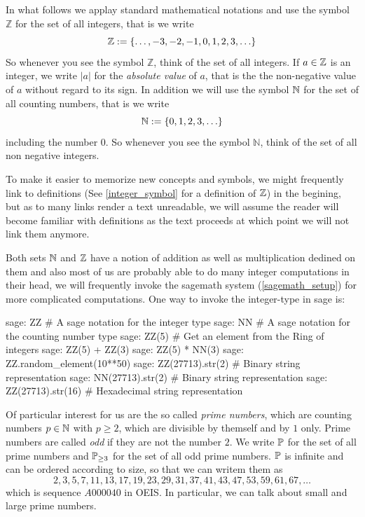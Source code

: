 In what follows we applay standard mathematical notations and use the symbol $\mathbb{Z}$ for the set of all integers, that is we write
\begin{equation}
\label{integer_symbol}
\mathbb{Z} := \{\ldots, -3,-2,-1,0,1,2,3,\ldots\}
\end{equation}
So whenever you see the symbol $\mathbb{Z}$, think of the set of all integers. If $a \in \mathbb{Z}$ is an integer, we write $|a|$ for the \textit{absolute value} of $a$, that is the the non-negative value of $a$ without regard to its sign. In addition we will use the symbol $\mathbb{N}$ for the set of all counting numbers, that is we write 
\begin{equation}
\label{integer_symbol}
\mathbb{N} := \{0,1,2,3,\ldots\}
\end{equation}
including the number $0$. So whenever you see the symbol $\mathbb{N}$, think of the set of all non negative integers. 

To make it easier to memorize new concepts and symbols, we might frequently link to definitions (See \ref{integer_symbol} for a definition of $\mathbb{Z}$) in the begining, but as to many links render a text unreadable, we will assume the reader will become familiar with definitions as the text proceeds at which point we will not link them anymore. 

Both sets $\mathbb{N}$ and $\mathbb{Z}$ have a notion of addition as well as multiplication dedined on them and also most of us are probably able to do many integer computations in their head, we will frequently invoke the sagemath system (\ref{sagemath_setup}) for more complicated computations. One way to invoke the integer-type in sage is:
\begin{sagecommandline}
sage: ZZ # A sage notation for the integer type
sage: NN # A sage notation for the counting number type
sage: ZZ(5) # Get an element from the Ring of integers
sage: ZZ(5) + ZZ(3)
sage: ZZ(5) * NN(3)
sage: ZZ.random_element(10**50)
sage: ZZ(27713).str(2) # Binary string representation
sage: NN(27713).str(2) # Binary string representation
sage: ZZ(27713).str(16) # Hexadecimal string representation
\end{sagecommandline}
Of particular interest for us are the so called \textit{prime numbers}, which are counting numbers $ p \in \mathbb{N} $ with $ p \geq 2 $, which are divisible by themself and by $ 1 $ only. Prime numbers are called \textit{odd} if they are not the number $ 2 $. We write $ \mathbb{P} $ for the set of all prime numbers and $ \mathbb{P} _{\geq 3} $ for the set of all odd prime numbers.
$\mathbb{P}$ is infinite and can be ordered according to size, so that we can writem them as
\begin{equation}
\label{eq: primenumber_sequence}
2, 3, 5, 7, 11, 13, 17, 19, 23, 29, 31, 37, 41, 43, 47, 53, 59, 61, 67, \ldots
\end{equation}
which is sequence $ A000040 $ in OEIS. In particular, we can talk about small and large prime numbers.

